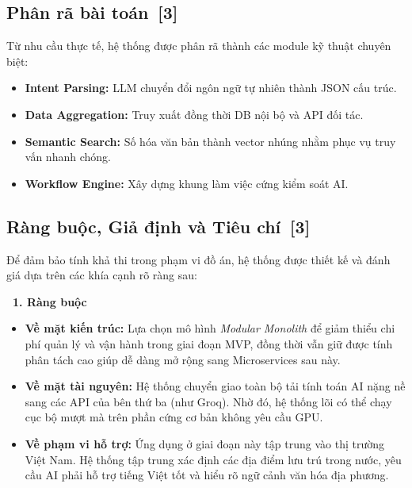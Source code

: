 \documentclass[12pt, a4paper]{article}
\begin{document}
\subsection[Phân rã bài toán]{Phân rã bài toán \,{\normalfont\small\textcolor{cyan!70!black}{[3]}}}
Từ nhu cầu thực tế, hệ thống được phân rã thành các module kỹ thuật chuyên biệt:
\begin{itemize}[label=\textcolor{blue!60}{\faCogs}]
  \item \textbf{Intent Parsing:} LLM chuyển đổi ngôn ngữ tự nhiên thành JSON cấu trúc.
  \item \textbf{Data Aggregation:} Truy xuất đồng thời DB nội bộ và API đối tác.
  \item \textbf{Semantic Search:} Số hóa văn bản thành vector nhúng nhằm phục vụ truy vấn nhanh chóng.
  \item \textbf{Workflow Engine:} Xây dựng khung làm việc cứng kiểm soát AI.
\end{itemize}

\subsection[Ràng buộc, Giả định và Tiêu chí]{Ràng buộc, Giả định và Tiêu chí \,{\normalfont\small\textcolor{cyan!70!black}{[3]}}}
Để đảm bảo tính khả thi trong phạm vi đồ án, hệ thống được thiết kế và đánh giá dựa trên các khía cạnh rõ ràng sau:

\vspace{0.3cm}
\noindent\textbf{\textcolor{blue!80!black}{\faLink \ 1. Ràng buộc}}
\begin{itemize}[label=\textcolor{gray!70!black}{\faCaretRight}]
  \item \textbf{Về mặt kiến trúc:} Lựa chọn mô hình \textit{Modular Monolith} để giảm thiểu chi phí quản lý và vận hành trong giai đoạn MVP, đồng thời vẫn giữ được tính phân tách cao giúp dễ dàng mở rộng sang Microservices sau này.
  \item \textbf{Về mặt tài nguyên:} Hệ thống chuyển giao toàn bộ tải tính toán AI nặng nề sang các API của bên thứ ba (như Groq). Nhờ đó, hệ thống lõi có thể chạy cục bộ mượt mà trên phần cứng cơ bản không yêu cầu GPU.
  \item \textbf{Về phạm vi hỗ trợ:} Ứng dụng ở giai đoạn này tập trung vào thị trường Việt Nam. Hệ thống tập trung xác định các địa điểm lưu trú trong nước, yêu cầu AI phải hỗ trợ tiếng Việt tốt và hiểu rõ ngữ cảnh văn hóa địa phương.
\end{itemize}
\end{document}
